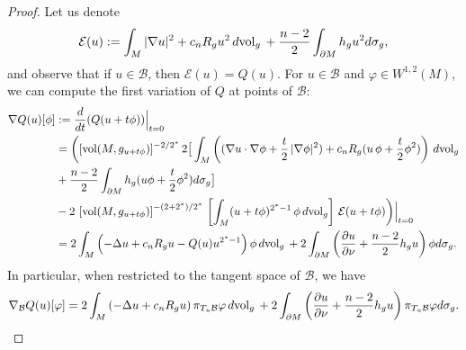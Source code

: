 \documentclass[12pt]{amsart}
\newcommand{\B}{\mathcal{B}}
\newcommand{\vol}{{\rm{vol}}}
\begin{document}
\begin{proof} 
	  Let us denote
	$$
	\mathcal E(u):=\int_M  |\nabla u|^2+ c_n R_gu^2\,d\vol_g\,+\frac{n-2}{2}\int_{\partial M} h_g u^2 d\sigma_g,
	$$ 
	and observe that if $u\in \B$, then $\mathcal E(u)=Q(u)$. For $u\in \B$ and $\varphi \in W^{1,2}(M)$,  we can compute the first variation of $Q$ at points of $\B$:
	\begin{align}
	\nabla Q(u)[\phi] &:= \frac{d}{dt}(Q (u + t\phi))\Big|_{t=0}\\ 
	&=\bigg( [\vol(M, g_{u+t\phi})]^{-2/2^*}\, 2\big[\int_M\left(( \nabla u\cdot\nabla \phi+\frac{t}{2}\,|\nabla \phi|^2)+c_n R_g(u\,\phi+\frac{t}{2}\phi^2)\right)\,d\vol_g \notag\\
    &+ \frac{n-2}{2}\int_{\partial M}h_g(u\phi+\frac{t}{2}\phi^2)d\sigma_g \big] \notag \\
	 &  -2\,\left[\vol(M, g_{u+t\phi}) \right]^{-(2+2^*)/2^*}\, \left[\int_M (u+t\phi)^{2^*-1} \,\phi \,d\vol_g\right]  \,\mathcal E(u+t\phi)\bigg)\Big|_{t=0} \notag 
	\\
	&= 2 \int_{M} \left(-\Delta u + c_nR_gu-Q(u)u^{2^*-1}\right)\phi\, d\vol_g\, + 2\int_{\partial M} \left( \frac{\partial u}{\partial \nu}+\frac{n-2}{2}h_g u   \right)\phi d\sigma_g.
    \end{align} 
	In particular, when restricted to the tangent space of $\B$, we have
	$$
	\nabla_{\B} Q(u)[\varphi] = 2\int_{M} \left(-\Delta u + c_nR_gu\right)\pi_{T_u\B}\varphi\, d\vol_g\, +2\int_{\partial M} \left( \frac{\partial u}{\partial \nu}+\frac{n-2}{2}h_g u   \right)\pi_{T_u\B}\varphi d\sigma_g .
	$$


\end{proof}
\end{document}
